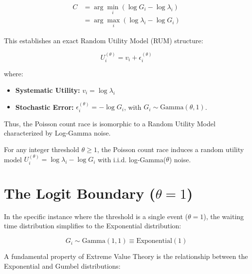 \documentclass[
  man,
  floatsintext,
  longtable,
  a4paper,
  nolmodern,
  notxfonts,
  notimes,
  colorlinks=true,linkcolor=blue,citecolor=blue,urlcolor=blue]{apa7}
\providecommand{\tightlist}{%
  \setlength{\itemsep}{0pt}\setlength{\parskip}{0pt}}
\begin{document}
\[
\begin{aligned} C &= \arg \min_{i} (\log G_i - \log \lambda_i) \\ &= \arg \max_{i} (\log \lambda_i - \log G_i) \end{aligned}
\]

This establishes an exact Random Utility Model (RUM) structure:

\[
U_i^{(\theta)} = v_i + \epsilon_i^{(\theta)}
\]

where:

\begin{itemize}
\tightlist
\item
  \textbf{Systematic Utility:} \(v_i = \log \lambda_i\)\\
\item
  \textbf{Stochastic Error:} \(\epsilon_i^{(\theta)} = -\log G_i\), with
  \(G_i \sim \text{Gamma}(\theta, 1)\).
\end{itemize}

Thus, the Poisson count race is isomorphic to a Random Utility Model
characterized by Log-Gamma noise.

\begin{tcolorbox}[enhanced jigsaw, colbacktitle=quarto-callout-note-color!10!white, bottomtitle=1mm, colback=white, arc=.35mm, coltitle=black, bottomrule=.15mm, breakable, toptitle=1mm, titlerule=0mm, colframe=quarto-callout-note-color-frame, toprule=.15mm, title={Result 1 (Log-Gamma Random Utility Family)}, rightrule=.15mm, left=2mm, leftrule=.75mm, opacityback=0, opacitybacktitle=0.6]

For any integer threshold \(\theta \ge 1\), the Poisson count race
induces a random utility model
\(U_i^{(\theta)} = \log \lambda_i - \log G_i\) with i.i.d.
log-Gamma(\(\theta\)) noise.

\end{tcolorbox}

\section{\texorpdfstring{The Logit Boundary
(\(\theta = 1\))}{The Logit Boundary (\textbackslash theta = 1)}}\label{the-logit-boundary-theta-1}

In the specific instance where the threshold is a single event
(\(\theta = 1\)), the waiting time distribution simplifies to the
Exponential distribution:

\[
G_i \sim \text{Gamma}(1, 1) \equiv \text{Exponential}(1)
\]

A fundamental property of Extreme Value Theory is the relationship
between the Exponential and Gumbel distributions:
\end{document}
